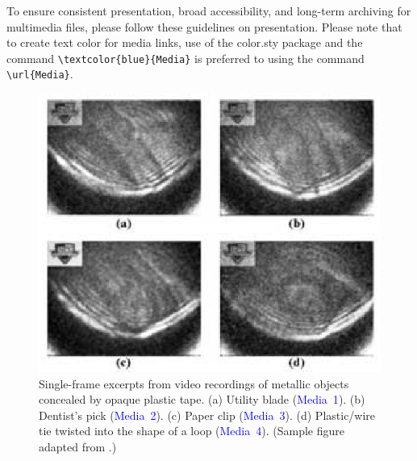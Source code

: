 \documentclass[10pt,letterpaper]{article}
\begin{document}
To ensure consistent presentation, broad accessibility, and long-term archiving for multimedia files, please follow these guidelines on presentation. Please note that to create text color for media links, use of the color.sty package and the command \verb|\textcolor{blue}{Media}| is preferred to using the command \verb|\url{Media}|.

\begin{figure}[h]
\centering\includegraphics{opexfig2}
\caption{Single-frame excerpts from video recordings of metallic objects concealed by opaque plastic tape. (a) Utility blade (\textcolor{blue}{Media~1}). (b) Dentist's pick (\textcolor{blue}{Media~2}). (c) Paper clip (\textcolor{blue}{Media~3}). (d) Plastic/wire tie twisted into the shape of a loop (\textcolor{blue}{Media~4}). (Sample figure adapted from \cite{samplefig}.)}
\end{figure}
\end{document}
